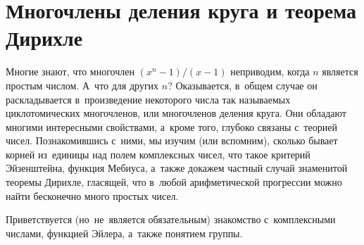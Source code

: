
\section*{Многочлены деления круга и теорема Дирихле}



Многие знают, что многочлен $(x^n - 1) / (x - 1)$ неприводим, когда $n$
является простым числом.
А~что для других $n$?
Оказывается, в~общем случае он раскладывается в~произведение некоторого числа
так называемых циклотомических многочленов, или многочленов деления круга.
Они обладают многими интересными свойствами, а~кроме того, глубоко связаны
с~теорией чисел.
Познакомившись с~ними, мы изучим (или вспомним), сколько бывает корней
из~единицы над полем комплексных чисел, что такое критерий Эйзенштейна, функция
Мебиуса, а~также докажем частный случай знаменитой теоремы Дирихле, гласящей,
что в~любой арифметической прогрессии можно найти бесконечно много простых
чисел.

Приветствуется (но~не~является обязательным) знакомство с~комплексными
числами, функцией Эйлера, а~также понятием группы.

